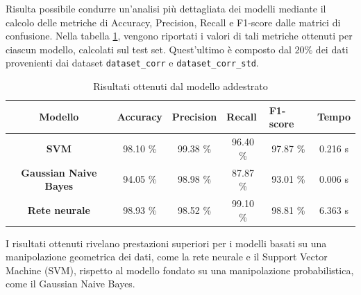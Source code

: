 Risulta possibile condurre un'analisi più dettagliata dei modelli mediante il
calcolo delle metriche di Accuracy, Precision, Recall e F1-score dalle matrici
di confusione. Nella tabella \ref{tab:risultati}, vengono riportati i valori di
tali metriche ottenuti per ciascun modello, calcolati sul test set. Quest'ultimo
è composto dal $20\%$ dei dati provenienti dai dataset \texttt{dataset\_corr} e
\texttt{dataset\_corr\_std}.
\begin{table}[!ht]
    \centering
    \begin{tabular}{@{}clllll@{}}
        \toprule
        \rowcolor[HTML]{EFEFEF}
        \textbf{Modello}                                      & \textbf{Accuracy}            & \textbf{Precision}           & \textbf{Recall}              & \textbf{F1-score}            & \textbf{Tempo}              \\ \midrule
        \cellcolor[HTML]{EFEFEF}\textbf{SVM}                  & \multicolumn{1}{c}{98.10 \%} & \multicolumn{1}{c}{99.38 \%} & \multicolumn{1}{c}{96.40 \%} & \multicolumn{1}{c}{97.87 \%} & \multicolumn{1}{c}{0.216 s} \\
        \cellcolor[HTML]{EFEFEF}\textbf{Gaussian Naive Bayes} & \multicolumn{1}{c}{94.05 \%} & \multicolumn{1}{c}{98.98 \%} & \multicolumn{1}{c}{87.87 \%} & \multicolumn{1}{c}{93.01 \%} & \multicolumn{1}{c}{0.006 s} \\
        \cellcolor[HTML]{EFEFEF}\textbf{Rete neurale}         & \multicolumn{1}{c}{98.93 \%} & \multicolumn{1}{c}{98.52 \%} & \multicolumn{1}{c}{99.10 \%} & \multicolumn{1}{c}{98.81 \%} & \multicolumn{1}{c}{6.363 s} \\ \bottomrule
    \end{tabular}
    \caption{Risultati ottenuti dal modello addestrato}
    \label{tab:risultati}
\end{table}

I risultati ottenuti rivelano prestazioni superiori per i modelli basati su una
manipolazione geometrica dei dati, come la rete neurale e il Support Vector
Machine (SVM), rispetto al modello fondato su una manipolazione probabilistica,
come il Gaussian Naive Bayes.

